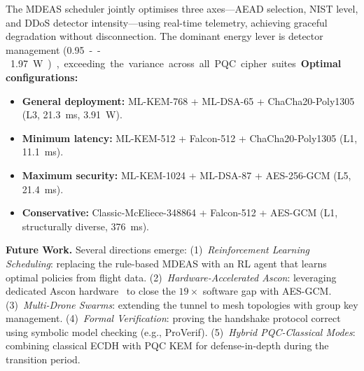 \documentclass[conference]{IEEEtran}
\begin{document}
The MDEAS scheduler jointly optimises three axes---AEAD selection, NIST level, and DDoS detector intensity---using real-time telemetry, achieving graceful degradation without disconnection.
The dominant energy lever is detector management (\SI{0.95}--\SI{1.97}{\watt}), exceeding the variance across all PQC cipher suites.

\textbf{Optimal configurations:}
\begin{itemize}[noitemsep]
    \item \textbf{General deployment:} ML-KEM-768 + ML-DSA-65 + ChaCha20-Poly1305 (L3, \SI{21.3}{\milli\second}, \SI{3.91}{\watt}).
    \item \textbf{Minimum latency:} ML-KEM-512 + Falcon-512 + ChaCha20-Poly1305 (L1, \SI{11.1}{\milli\second}).
    \item \textbf{Maximum security:} ML-KEM-1024 + ML-DSA-87 + AES-256-GCM (L5, \SI{21.4}{\milli\second}).
    \item \textbf{Conservative:} Classic-McEliece-348864 + Falcon-512 + AES-GCM (L1, structurally diverse, \SI{376}{\milli\second}).
\end{itemize}

\textbf{Future Work.}
Several directions emerge:
(1)~\emph{Reinforcement Learning Scheduling}: replacing the rule-based MDEAS with an RL agent that learns optimal policies from flight data.
(2)~\emph{Hardware-Accelerated Ascon}: leveraging dedicated Ascon hardware~\cite{ascon} to close the $19\times$ software gap with AES-GCM.
(3)~\emph{Multi-Drone Swarms}: extending the tunnel to mesh topologies with group key management.
(4)~\emph{Formal Verification}: proving the handshake protocol correct using symbolic model checking (e.g., ProVerif).
(5)~\emph{Hybrid PQC-Classical Modes}: combining classical ECDH with PQC KEM for defense-in-depth during the transition period.
\end{document}
